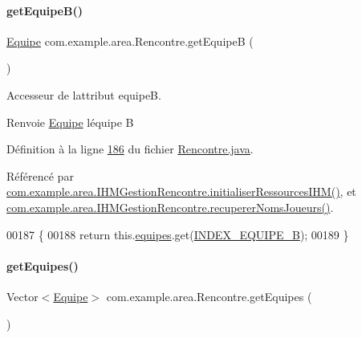 \paragraph{\texorpdfstring{get\+Equipe\+B()}{getEquipeB()}}
{\footnotesize\ttfamily \hyperlink{classcom_1_1example_1_1area_1_1_equipe}{Equipe} com.\+example.\+area.\+Rencontre.\+get\+EquipeB (\begin{DoxyParamCaption}{ }\end{DoxyParamCaption})}



Accesseur de l\textquotesingle{}attribut equipeB. 

\begin{DoxyReturn}{Renvoie}
\hyperlink{classcom_1_1example_1_1area_1_1_equipe}{Equipe} l\textquotesingle{}équipe B 
\end{DoxyReturn}


Définition à la ligne \hyperlink{_rencontre_8java_source_l00186}{186} du fichier \hyperlink{_rencontre_8java_source}{Rencontre.\+java}.



Référencé par \hyperlink{_i_h_m_gestion_rencontre_8java_source_l00142}{com.\+example.\+area.\+I\+H\+M\+Gestion\+Rencontre.\+initialiser\+Ressources\+I\+H\+M()}, et \hyperlink{_i_h_m_gestion_rencontre_8java_source_l00281}{com.\+example.\+area.\+I\+H\+M\+Gestion\+Rencontre.\+recuperer\+Noms\+Joueurs()}.


\begin{DoxyCode}
00187     \{
00188         \textcolor{keywordflow}{return} this.\hyperlink{classcom_1_1example_1_1area_1_1_rencontre_accbafe5a878f457fb7119cfd55401c86}{equipes}.get(\hyperlink{classcom_1_1example_1_1area_1_1_rencontre_a08ed5cef8f2bbb80b2010bdb60c515d6}{INDEX\_EQUIPE\_B});
00189     \}
\end{DoxyCode}
\mbox{\label{classcom_1_1example_1_1area_1_1_rencontre_a59f379be02ce6c587ad59d1b30e3c9a5}} 
\paragraph{\texorpdfstring{get\+Equipes()}{getEquipes()}}
{\footnotesize\ttfamily Vector$<$\hyperlink{classcom_1_1example_1_1area_1_1_equipe}{Equipe}$>$ com.\+example.\+area.\+Rencontre.\+get\+Equipes (\begin{DoxyParamCaption}{ }\end{DoxyParamCaption})}



